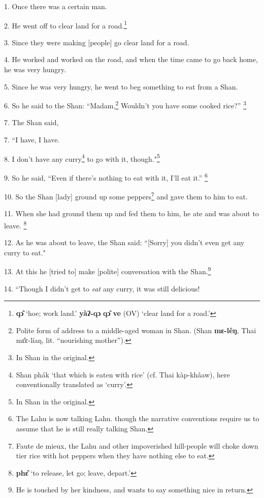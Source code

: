 \setcounter{footnote}{0}


1. Once there was a certain man.

2. He went off to clear land for a road.\footnote{\textbf{qɔ̂} `hoe; work land.' \textbf{yàʔ-qɔ} \textbf{qɔ̂} \textbf{ve} (OV) `clear land for a road.'}

3. Since they were making [people] go clear land for a road.

4. He worked and worked on the road, and when the time came to go back home, he
was very hungry.

5. Since he was very hungry, he went to beg something to eat from a Shan.

6. So he said to the Shan: ``Madam,\footnote{Polite form of address to a middle-aged woman in Shan. (Shan \textbf{mɛ-lêŋ}, Thai mɛ̂ɛ-líaŋ, lit. ``nourishing mother'').} Wouldn't you have some cooked rice?''
\footnote{In Shan in the original.}

7. The Shan said,

7. ``I have, I have.

8. I don't have any curry\footnote{Shan phák `that which is eaten with rice' (cf. Thai kàp-khâaw), here conventionally translated as `curry'.} to go with it, though."\footnote{In Shan in the original.}

9. So he said, ``Even if there's nothing to eat with it, I'll eat it.''
\footnote{The Lahu is now talking Lahu. though the narrative conventions require us to assume that he is still really talking Shan.}

10. So the Shan [lady] ground up some peppers\footnote{Faute de mieux, the Lahu and other impoverished hill-people will choke down tier rice with hot peppers when they have nothing else to eat.} and gave them to him to eat.

11. When she had ground them up and fed them to him, he ate and was about to leave.
\footnote{\textbf{phɛ̂} `to release, let go; leave, depart.'}

12. As he was about to leave, the Shan said: ``[Sorry] you didn't even get
any curry to eat."

13. At this he [tried to] make [polite] conversation with the Shan.\footnote{He is touched by her kindness, and wants to say something nice in return.}

14. ``Though I didn't get to \textit{eat} any curry, it was still delicious!

